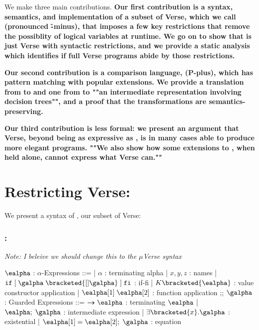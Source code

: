 \documentclass[]{article}
\begin{document}
We make three main contributions. \bf{Our first contribution} is a syntax,
semantics, and implementation of a subset of Verse, which we call \VMinus
(pronounced \v-minus), that imposes a few key restrictions that remove the
possiblity of logical variables at runtime. We go on
to show that \VMinus is just Verse with syntactic restrictions, and we provide a
static analysis which identifies if full Verse programs abide by those
restrictions. 


\bf{Our second contribution} is a comparison language, \Pplus (P-plus), which
has pattern matching with popular extensions. We provide  a translation from
\Pplus to \VMinus and one from \VMinus to ""an intermediate representation
involving decision trees"", and a proof that the transformations are
semantics-preserving. 

\bf{Our third contribution} is less formal: we present an argument that Verse,
beyond being as expressive as \Pplus, is in many cases able to produce more elegant
programs. ""We also show how some extensions to \Pplus, when held alone, cannot
express what Verse can.""

\section{Restricting Verse: \VMinus}

We present a syntax of \VMinus, our subset of Verse: 

\subsubsection{\VMinus:}
\it{Note: I beleive we should change this to the ${\mu}$Verse syntax}
\begin{center}
    \begin{bnf}
    $\ealpha$ : \textsf{$\alpha$-Expressions} ::=
    | $\alpha$ : terminating alpha
    | $x, y, z$ : names
    | $\tt{if} \; \tt{[}\; \galpha \; \bracketed{[] \galpha} \;\tt{]} \; \tt{fi}$ : if-fi 
    | $K \bracketed{\ealpha}$ : value constructor application 
    | $\ealpha[1] \; \ealpha[2]$ : function application 
    ;;
    $\galpha$ : \textsf{Guarded Expressions} ::=  
    $\boldsymbol{\rightarrow}\ealpha$ : terminating $\ealpha$ 
    | $\ealpha; \; \galpha$ : intermediate expression 
    | $\exists \bracketed{x} \tt{.} \galpha$ : existential 
    | $\ealpha[1] = \ealpha[2]; \; \galpha$ : equation 
    \end{bnf}
\end{center}
\end{document}
